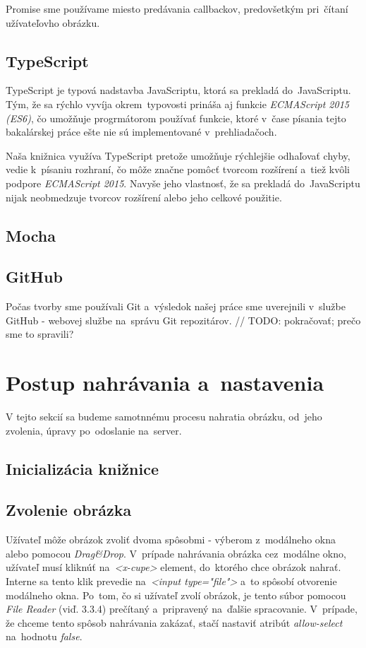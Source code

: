 Promise sme používame miesto predávania callbackov, predovšetkým pri~čítaní užívateľovho obrázku.

\subsection{TypeScript}

TypeScript je typová nadstavba JavaScriptu, ktorá sa prekladá do~JavaScriptu. Tým, že sa rýchlo vyvíja okrem~typovosti prináša aj funkcie \emph{ECMAScript 2015 (ES6)}, čo umožňuje progrmátorom používať funkcie, ktoré v~čase písania tejto bakalárskej práce ešte nie sú implementované v~prehliadačoch.

Naša knižnica využíva TypeScript pretože umožňuje rýchlejšie odhaľovať chyby, vedie k~písaniu rozhraní, čo môže značne pomôcť tvorcom rozšírení a~tiež kvôli podpore \emph{ECMAScript 2015}. Navyše jeho vlastnosť, že sa prekladá do~JavaScriptu nijak neobmedzuje tvorcov rozšírení alebo jeho celkové použitie.

\subsection{Mocha}
\subsection{GitHub}

Počas tvorby sme používali Git a~výsledok našej práce sme uverejnili v~službe GitHub - webovej službe na~správu Git repozitárov. // TODO: pokračovať; prečo sme to spravili?

\section{Postup nahrávania a~nastavenia}

V tejto sekcií sa budeme samotnnému procesu nahratia obrázku, od~jeho zvolenia, úpravy po~odoslanie na~server.

\subsection{Inicializácia knižnice}
\subsection{Zvolenie obrázka}

Užívateľ môže obrázok zvoliť dvoma spôsobmi - výberom z~modálneho okna alebo pomocou \emph{Drag&Drop}. V~prípade nahrávania obrázka cez~modálne okno, užívateľ musí kliknúť na~\emph{<x-cupe>} element, do~ktorého chce obrázok nahrať. Interne sa tento klik prevedie na~\emph{<input type="file"\textgreater} a~to spôsobí otvorenie modálneho okna. Po~tom, čo si užívateľ zvolí obrázok, je tento súbor pomocou \emph{File Reader} (viď. 3.3.4) prečítaný a~pripravený na~ďalšie spracovanie. V~prípade, že chceme tento spôsob nahrávania zakázať, stačí nastaviť atribút \emph{allow-select} na~hodnotu \emph{false}.

